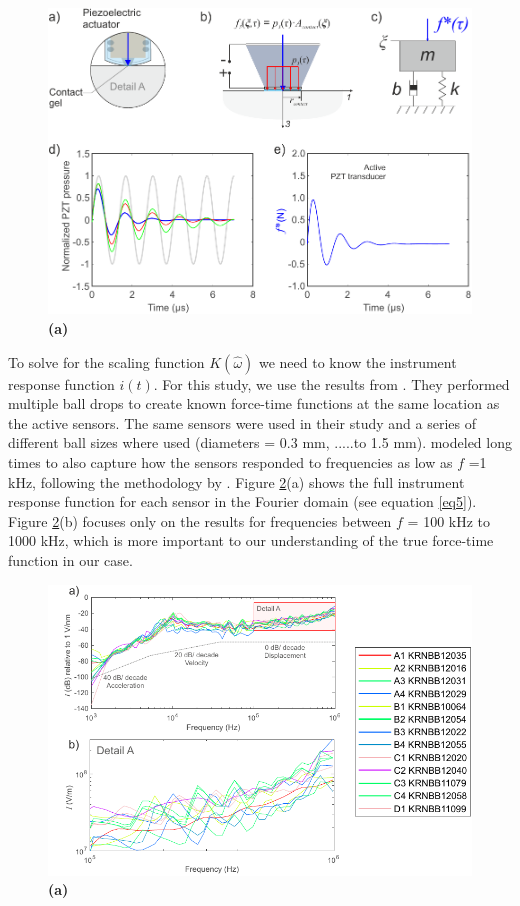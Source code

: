 \documentclass[preprint,3p, 11pt,authoryear]{elsarticle}
\begin{document}
\begin{figure}[ht]
     	\centering
\includegraphics[scale= 0.9]{FIG5b.pdf} 
\caption{\textbf{(a)}  }
	\label{fig6} 
\end{figure}

To solve for the scaling function $K(\hat{\omega})$ we need to know the instrument response function $i(t)$. For this study, we use the results from \citet{Wu2020}. They performed multiple ball drops to create known force-time functions at the same location as the active sensors. The same sensors were used in their study and a series of different ball sizes where used (diameters = 0.3 mm, .....to 1.5 mm).  \citet{Wu2020} modeled long times to also capture how the sensors responded to frequencies as low as $f$ =1 kHz, following the methodology by \citet{Wu2018}.  Figure \ref{fig6}(a) shows the full instrument response function for each sensor in the Fourier domain (see equation \ref{eq5}).  Figure \ref{fig6}(b) focuses only on the results for frequencies between $f$ = 100 kHz to 1000 kHz, which is more important to our understanding of the true force-time function in our case.  


\begin{figure}[ht]
     	\centering
\includegraphics[scale= 0.9]{FIG6.pdf} 
\caption{\textbf{(a)}  }
	\label{fig6} 
\end{figure}
\end{document}
